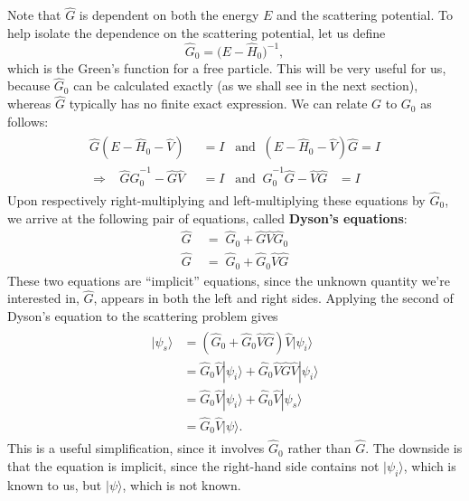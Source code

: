 \documentclass[pra,12pt]{revtex4}
\begin{document}
Note that $\hat{G}$ is dependent on both the energy $E$ and the
scattering potential.  To help isolate the dependence on the
scattering potential, let us define
\begin{equation}
  \hat{G}_0=\big(E-\hat{H}_0\big)^{-1},
\end{equation}
which is the Green's function for a free particle.  This will be very
useful for us, because $\hat{G}_0$ can be calculated exactly (as we
shall see in the next section), whereas $\hat{G}$ typically has no
finite exact expression.  We can relate $G$ to $G_0$ as follows:
\begin{align}
  \begin{aligned}
    \hat{G}(E-\hat{H}_0 - \hat{V})\;\; &= I \;\;\;\mathrm{and}\;\; (E-\hat{H}_0 - \hat{V})\hat{G} = I \\ \Rightarrow \;\;\; \hat{G} \hat{G}_0^{-1} - \hat{G}\hat{V} &= I \;\;\; \mathrm{and}\;\; \hat{G}_0^{-1} \hat{G} - \hat{V}\hat{G} \;\;\;= I
  \end{aligned}
\end{align}
Upon respectively right-multiplying and left-multiplying these equations
by $\hat{G}_0$, we arrive at the following pair of equations, called
\textbf{Dyson's equations}:
$$\boxed{\begin{aligned} \;\;\hat{G} \;&= \; \hat{G}_0 + \hat{G}\hat{V}\hat{G}_0\;\; \\ \;\;\hat{G} \;&=\; \hat{G}_0 + \hat{G}_0\hat{V}\hat{G} \;\;\end{aligned}}$$
These two equations are ``implicit'' equations, since the unknown
quantity we're interested in, $\hat{G}$, appears in both the left and
right sides.  Applying the second of Dyson's equation to the
scattering problem gives
\begin{align}
  \begin{aligned}|\psi_s\rangle &= \left(\hat{G}_0 + \hat{G}_0\hat{V}\hat{G}\right) \hat{V} |\psi_i\rangle \\ &= \hat{G}_0 \hat{V} |\psi_i\rangle + \hat{G}_0\hat{V}\hat{G} \hat{V} |\psi_i\rangle \\ &= \hat{G}_0 \hat{V} |\psi_i\rangle + \hat{G}_0\hat{V} |\psi_s\rangle \\ &= \hat{G}_0\hat{V} |\psi\rangle.\end{aligned}
\end{align}
This is a useful simplification, since it involves $\hat{G}_0$ rather
than $\hat{G}$.  The downside is that the equation is implicit, since
the right-hand side contains not $|\psi_i\rangle$, which is known to
us, but $|\psi\rangle$, which is not known.
\end{document}
